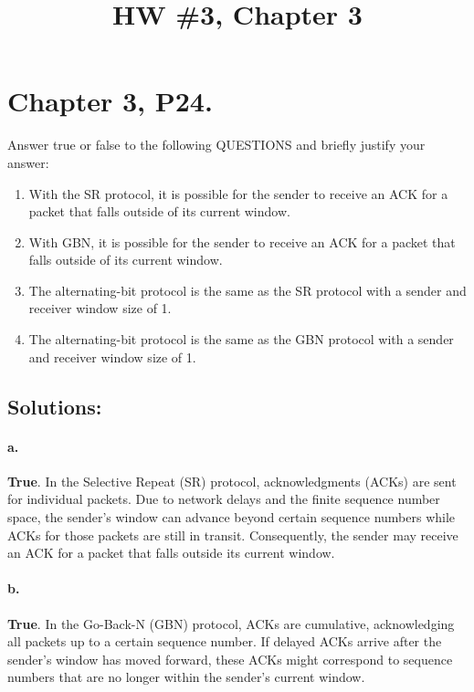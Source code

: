 \documentclass{cshwk}
\title{HW \#3, Chapter 3}
\begin{document}
\maketitle

\section*{Chapter 3, P24.}

Answer true or false to the following QUESTIONS and briefly justify your answer:

\begin{enumerate}
    \item With the SR protocol, it is possible for the sender to receive an ACK for a packet that falls outside of its current window.
    \item With GBN, it is possible for the sender to receive an ACK for a packet that falls outside of its current window.
    \item The alternating-bit protocol is the same as the SR protocol with a sender and receiver window size of 1.
    \item The alternating-bit protocol is the same as the GBN protocol with a sender and receiver window size of 1.
\end{enumerate}

\subsection*{Solutions:}


\paragraph{a.} \textbf{True}. In the Selective Repeat (SR) protocol, acknowledgments (ACKs) are sent for individual packets. Due to network delays and the finite sequence number space, the sender's window can advance beyond certain sequence numbers while ACKs for those packets are still in transit. Consequently, the sender may receive an ACK for a packet that falls outside its current window.

\paragraph{b.} \textbf{True}. In the Go-Back-N (GBN) protocol, ACKs are cumulative, acknowledging all packets up to a certain sequence number. If delayed ACKs arrive after the sender's window has moved forward, these ACKs might correspond to sequence numbers that are no longer within the sender's current window.
\end{document}
